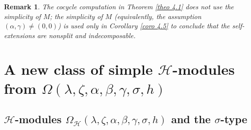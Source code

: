 \documentclass[12pt,reqno]{amsart}
\numberwithin{equation}{section}
\newtheorem{rema}[theo]{Remark}
\begin{document}
\begin{rema}\label{rema4.6}
The cocycle computation in Theorem \ref{theo 4.1} does not use the simplicity of $M$; the simplicity of $M$ (equivalently, the assumption $(\alpha,\gamma)\neq(0,0)$) is used only in Corollary \ref{coro 4.5} to conclude that the self-extensions are nonsplit and indecomposable.
\end{rema}
















































































\section{\texorpdfstring{ A new class of simple $\mathcal{H}$-modules %
from $\Omega(\lambda, \zeta, \alpha,\beta,\gamma,\sigma,h)$}{A new class of irreducible modules over hat{mathcal{H}}from Omega(lambda,zeta,alpha,beta,gamma,h)}}\label{section 5}

\subsection{\texorpdfstring{ $\mathcal{H}$-modules $\Omega_{\mathcal{H}}(\lambda,\zeta,\alpha,\beta,\gamma,\sigma,h)$ and the $\sigma$-type}{1}}
\end{document}
